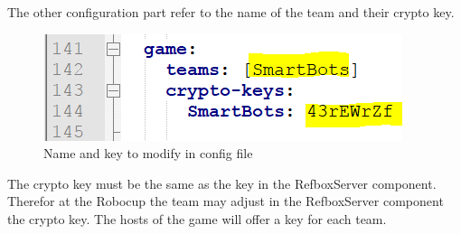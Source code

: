 The other configuration part refer to the name of the team and their crypto key. 

\begin{figure}[!h]
\centering
\includegraphics[]{pic/config_file_2.png}
\caption{Name and key to modify in config file}
\label{fig:configFile2}
\end{figure}

The crypto key must be the same as the key in the RefboxServer component. Therefor at the Robocup the team may adjust in the RefboxServer component the crypto key. The hosts of the game will offer a key for each team.

